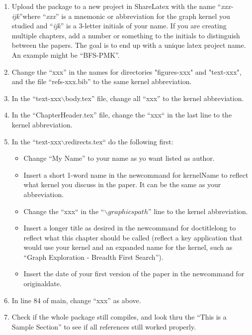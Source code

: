 \begin{enumerate}[noitemsep,nolistsep,leftmargin=*]

\item Upload the package to a new project in ShareLatex with the  name ``\textit{xxx-ijk}''where ``\textit{xxx}'' is a mnemonic or abbreviation for the graph kernel you studied and ``\textit{ijk}'' is a 3-letter initials of your name. If you are creating multiple chapters, add a number or something to the initials to distinguish between the papers. The goal is to end up with a unique latex project name. An example might be ``BFS-PMK''.

\item Change the ``xxx'' in the names for directories "figures-xxx" and "text-xxx", and the file ``refs-xxx.bib'' to the same kernel abbreviation.

\item In the ``text-xxx$\backslash$body.tex'' file, change all ``xxx'' to the kernel abbreviation.

\item In the ``ChapterHeader.tex'' file, change the ``xxx`` in the last line to the kernel abbreviation.

\item In the ``text-xxx$\backslash$redirects.tex`` do the following first:
    \begin{itemize}[noitemsep,nolistsep,leftmargin=*]
    \item Change ``My Name'' to your name as yo want listed as author.
    \item Insert a short 1-word name in the newcommand for kernelName to reflect what kernel you discuss in the paper. It can be the same as your abbreviation.
    \item Change the ``xxx`` in the ``$\backslash graphicspath$'' line to the kernel abbreviation.
    \item Insert a longer title as desired in the newcommand for doctitlelong to reflect what this chapter should be called (reflect a key application that would use your kernel and an expanded name for the kernel, such as ``Graph Exploration - Breadth First Search'').
    \item Insert the date of your first version of the paper in the newcommand for originaldate.
    \end{itemize}

\item In line 84 of main, change ``xxx'' as above.

\item Check if the whole package still compiles, and look thru the ``This is a Sample Section'' to see if all references still worked properly.


\end{enumerate}
